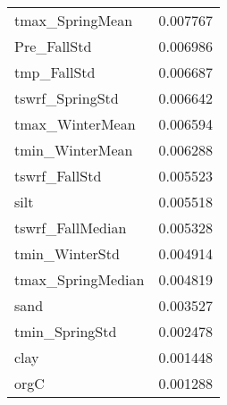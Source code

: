 \begin{tabular}{lr}
tmax_SpringMean & 0.007767 \\
Pre_FallStd & 0.006986 \\
tmp_FallStd & 0.006687 \\
tswrf_SpringStd & 0.006642 \\
tmax_WinterMean & 0.006594 \\
tmin_WinterMean & 0.006288 \\
tswrf_FallStd & 0.005523 \\
silt & 0.005518 \\
tswrf_FallMedian & 0.005328 \\
tmin_WinterStd & 0.004914 \\
tmax_SpringMedian & 0.004819 \\
sand & 0.003527 \\
tmin_SpringStd & 0.002478 \\
clay & 0.001448 \\
orgC & 0.001288 \\
\bottomrule
\end{tabular}
